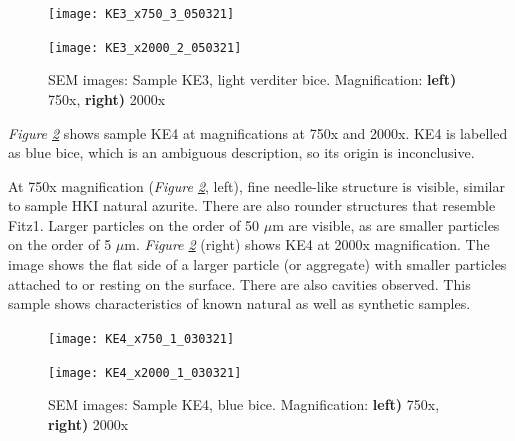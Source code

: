 \begin{figure}[H]
\centering
\begin{minipage}{.45\textwidth}
  \centering
  \texttt{[image: KE3\_x750\_3\_050321]}
\end{minipage}
\begin{minipage}{.45\textwidth}
  \centering
  \texttt{[image: KE3\_x2000\_2\_050321]}
\end{minipage}
\caption[SEM images: Sample KE3, light verditer bice]{SEM images: Sample KE3, light verditer bice. Magnification: \textbf{left)} 750x, \textbf{right)} 2000x}
\label{fig:KE3_sem_1}
\end{figure}


\textit{Figure \ref{fig:KE4_sem_1}} shows sample KE4 at magnifications at 750x and 2000x. KE4 is labelled as blue bice, which is an ambiguous description, so its origin is inconclusive.

At 750x magnification (\textit{Figure \ref{fig:KE4_sem_1}}, left), fine needle-like structure is visible, similar to sample HKI natural azurite. There are also rounder structures that resemble Fitz1. Larger particles on the order of 50 $\mu$m are visible, as are smaller particles on the order of 5 $\mu$m. \textit{Figure \ref{fig:KE4_sem_1}} (right) shows KE4 at 2000x magnification. The image shows the flat side of a larger particle (or aggregate) with smaller particles attached to or resting on the surface. There are also cavities observed. This sample shows characteristics of known natural as well as synthetic samples.

\begin{figure}[H]
\centering
\begin{minipage}{.45\textwidth}
  \centering
  \texttt{[image: KE4\_x750\_1\_030321]}
\end{minipage}
\begin{minipage}{.45\textwidth}
  \centering
  \texttt{[image: KE4\_x2000\_1\_030321]}
\end{minipage}
\caption[SEM images: Sample KE4, blue bice]{SEM images: Sample KE4, blue bice. Magnification: \textbf{left)} 750x, \textbf{right)} 2000x}
\label{fig:KE4_sem_1}
\end{figure}



